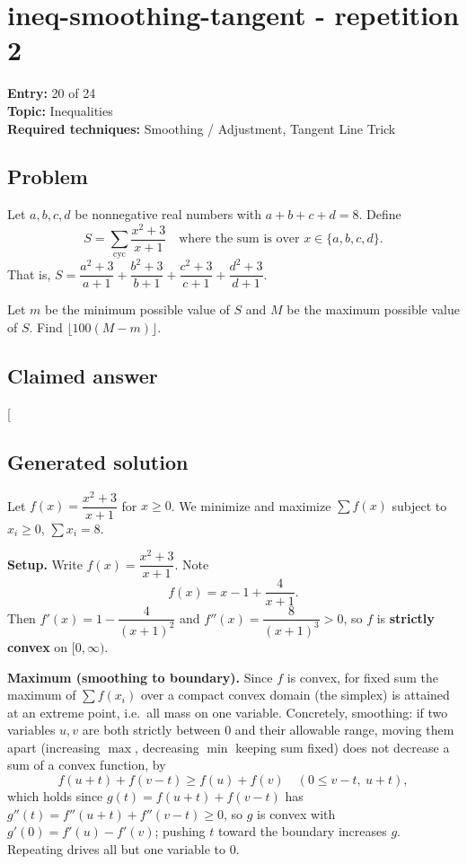 \documentclass[
  11pt,
  letterpaper,
]{article}
\begin{document}
\clearpage

\section{ineq-smoothing-tangent - repetition
2}\label{ineq-smoothing-tangent---repetition-2}

\textbf{Entry:} 20 of 24\\
\textbf{Topic:} Inequalities\\
\textbf{Required techniques:} Smoothing / Adjustment, Tangent Line Trick

\subsection{Problem}\label{problem-19}

Let \(a,b,c,d\) be nonnegative real numbers with \(a+b+c+d=8\). Define
\[
S=\sum_{\text{cyc}} \frac{x^2+3}{x+1}\quad\text{where the sum is over }x\in\{a,b,c,d\}.
\] That is,
\(S=\dfrac{a^2+3}{a+1}+\dfrac{b^2+3}{b+1}+\dfrac{c^2+3}{c+1}+\dfrac{d^2+3}{d+1}\).

Let \(m\) be the minimum possible value of \(S\) and \(M\) be the
maximum possible value of \(S\). Find \(\lfloor 100(M-m)\rfloor\).

\subsection{Claimed answer}\label{claimed-answer-19}

{[}\boxed{500}{]}

\subsection{Generated solution}\label{generated-solution-19}

Let \(f(x)=\dfrac{x^2+3}{x+1}\) for \(x\ge 0\). We minimize and maximize
\(\sum f(x)\) subject to \(x_i\ge 0\), \(\sum x_i=8\).

\textbf{Setup.} Write \(f(x)=\dfrac{x^2+3}{x+1}\). Note \[
f(x)=x-1+\frac{4}{x+1}.
\] Then \(f'(x)=1-\dfrac{4}{(x+1)^2}\) and
\(f''(x)=\dfrac{8}{(x+1)^3}>0\), so \(f\) is \textbf{strictly convex} on
\([0,\infty)\).

\textbf{Maximum (smoothing to boundary).} Since \(f\) is convex, for
fixed sum the maximum of \(\sum f(x_i)\) over a compact convex domain
(the simplex) is attained at an extreme point, i.e.~all mass on one
variable. Concretely, smoothing: if two variables \(u,v\) are both
strictly between \(0\) and their allowable range, moving them apart
(increasing \(\max\), decreasing \(\min\) keeping sum fixed) does not
decrease a sum of a convex function, by \[
f(u+t)+f(v-t)\ge f(u)+f(v)\quad(0\le v-t,\ u+t),
\] which holds since \(g(t)=f(u+t)+f(v-t)\) has
\(g''(t)=f''(u+t)+f''(v-t)\ge 0\), so \(g\) is convex with
\(g'(0)=f'(u)-f'(v)\); pushing \(t\) toward the boundary increases
\(g\). Repeating drives all but one variable to \(0\).
\end{document}
